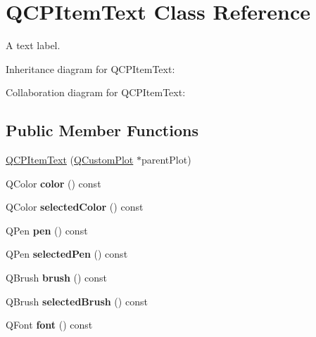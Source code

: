 \hypertarget{classQCPItemText}{}\section{Q\+C\+P\+Item\+Text Class Reference}
\label{classQCPItemText}


A text label.  




Inheritance diagram for Q\+C\+P\+Item\+Text\+:


Collaboration diagram for Q\+C\+P\+Item\+Text\+:
\subsection*{Public Member Functions}
\begin{DoxyCompactItemize}
\item 
\hyperlink{classQCPItemText_a77ff96a2972a00872ff8f8c67143abbe}{Q\+C\+P\+Item\+Text} (\hyperlink{classQCustomPlot}{Q\+Custom\+Plot} $\ast$parent\+Plot)
\item 
\mbox{\label{classQCPItemText_a071ec7567ae4deae2262a5b861df7d54}} 
Q\+Color {\bfseries color} () const
\item 
\mbox{\label{classQCPItemText_a6e13d5497ea634fe1ee9f4aac94f664c}} 
Q\+Color {\bfseries selected\+Color} () const
\item 
\mbox{\label{classQCPItemText_a7039d313069547682f28688448333979}} 
Q\+Pen {\bfseries pen} () const
\item 
\mbox{\label{classQCPItemText_a852a79afa0e88e29e11474d323440126}} 
Q\+Pen {\bfseries selected\+Pen} () const
\item 
\mbox{\label{classQCPItemText_a2600b9b419f17e2e2381f5ed8267da62}} 
Q\+Brush {\bfseries brush} () const
\item 
\mbox{\label{classQCPItemText_a300770cc32acf3e92763651803482563}} 
Q\+Brush {\bfseries selected\+Brush} () const
\item 
\mbox{\label{classQCPItemText_a44a564431890ffdfe0f978f8732cfb81}} 
Q\+Font {\bfseries font} () const
\item 

\end{DoxyCompactItemize}
